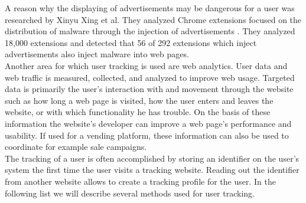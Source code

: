 			A reason why the displaying of advertisements may be dangerous for a user was researched by Xinyu Xing et al. They analyzed Chrome extensions focused on the distribution of malware through the injection of advertisements \cite{Xing:2015:UMT:2736277.2741630}. They analyzed 18,000 extensions and detected that 56 of 292 extensions which inject advertisements also inject malware into web pages. %
			\\
			
			Another area for which user tracking is used are web analytics. User data and web traffic is measured, collected, and analyzed to improve web usage. Targeted data is primarily the user's interaction with and movement through the website such as how long a web page is visited, how the user enters and leaves the website, or with which functionality he has trouble. On the basis of these information the website's developer can improve a web page's performance and usability. If used for a vending platform, these information can also be used to coordinate for example sale campaigns. \\
			
			The tracking of a user is often accomplished by storing an identifier on the user's system the first time the user visits a tracking website. Reading out the identifier from another website allows to create a tracking profile for the user. In the following list we will describe several methods used for user tracking. \\
			
